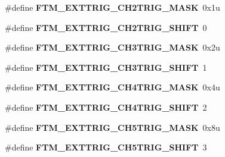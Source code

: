 \begin{DoxyCompactItemize}
\item 
\hypertarget{group___f_t_m___register___masks_ga156b1af5902f975c8d6b667e77ce11da}{}\#define {\bfseries F\+T\+M\+\_\+\+E\+X\+T\+T\+R\+I\+G\+\_\+\+C\+H2\+T\+R\+I\+G\+\_\+\+M\+A\+S\+K}~0x1u\label{group___f_t_m___register___masks_ga156b1af5902f975c8d6b667e77ce11da}

\item 
\hypertarget{group___f_t_m___register___masks_ga6bd01126a4e39a0ccf9446da55a86c53}{}\#define {\bfseries F\+T\+M\+\_\+\+E\+X\+T\+T\+R\+I\+G\+\_\+\+C\+H2\+T\+R\+I\+G\+\_\+\+S\+H\+I\+F\+T}~0\label{group___f_t_m___register___masks_ga6bd01126a4e39a0ccf9446da55a86c53}

\item 
\hypertarget{group___f_t_m___register___masks_gaeec1aec17cdbd9a74b521b085dee6bf2}{}\#define {\bfseries F\+T\+M\+\_\+\+E\+X\+T\+T\+R\+I\+G\+\_\+\+C\+H3\+T\+R\+I\+G\+\_\+\+M\+A\+S\+K}~0x2u\label{group___f_t_m___register___masks_gaeec1aec17cdbd9a74b521b085dee6bf2}

\item 
\hypertarget{group___f_t_m___register___masks_ga9e1c577c8cb405f8e8b518445ca1139a}{}\#define {\bfseries F\+T\+M\+\_\+\+E\+X\+T\+T\+R\+I\+G\+\_\+\+C\+H3\+T\+R\+I\+G\+\_\+\+S\+H\+I\+F\+T}~1\label{group___f_t_m___register___masks_ga9e1c577c8cb405f8e8b518445ca1139a}

\item 
\hypertarget{group___f_t_m___register___masks_gaf8bedf8c8979cb1fa16cb9b35c7a4399}{}\#define {\bfseries F\+T\+M\+\_\+\+E\+X\+T\+T\+R\+I\+G\+\_\+\+C\+H4\+T\+R\+I\+G\+\_\+\+M\+A\+S\+K}~0x4u\label{group___f_t_m___register___masks_gaf8bedf8c8979cb1fa16cb9b35c7a4399}

\item 
\hypertarget{group___f_t_m___register___masks_ga314862acbbedef36aca6aaccd9b1ff74}{}\#define {\bfseries F\+T\+M\+\_\+\+E\+X\+T\+T\+R\+I\+G\+\_\+\+C\+H4\+T\+R\+I\+G\+\_\+\+S\+H\+I\+F\+T}~2\label{group___f_t_m___register___masks_ga314862acbbedef36aca6aaccd9b1ff74}

\item 
\hypertarget{group___f_t_m___register___masks_ga26b412d681cbb61d30d2e9d25c906b66}{}\#define {\bfseries F\+T\+M\+\_\+\+E\+X\+T\+T\+R\+I\+G\+\_\+\+C\+H5\+T\+R\+I\+G\+\_\+\+M\+A\+S\+K}~0x8u\label{group___f_t_m___register___masks_ga26b412d681cbb61d30d2e9d25c906b66}

\item 
\hypertarget{group___f_t_m___register___masks_gadb3658c9b3090cf71c98a986137a0295}{}\#define {\bfseries F\+T\+M\+\_\+\+E\+X\+T\+T\+R\+I\+G\+\_\+\+C\+H5\+T\+R\+I\+G\+\_\+\+S\+H\+I\+F\+T}~3\label{group___f_t_m___register___masks_gadb3658c9b3090cf71c98a986137a0295}


\end{DoxyCompactItemize}
